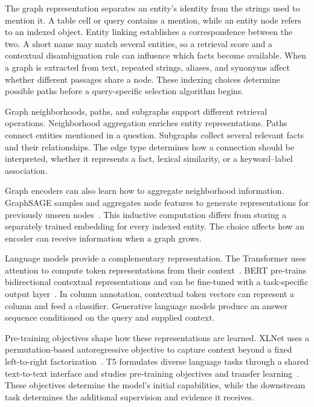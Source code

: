 The graph representation separates an entity's identity from the strings used to mention it. A table cell or query contains a mention, while an entity node refers to an indexed object. Entity linking establishes a correspondence between the two. A short name may match several entities, so a retrieval score and a contextual disambiguation rule can influence which facts become available. When a graph is extracted from text, repeated strings, aliases, and synonyms affect whether different passages share a node. These indexing choices determine possible paths before a query-specific selection algorithm begins.

Graph neighborhoods, paths, and subgraphs support different retrieval operations. Neighborhood aggregation enriches entity representations. Paths connect entities mentioned in a question. Subgraphs collect several relevant facts and their relationships. The edge type determines how a connection should be interpreted, whether it represents a fact, lexical similarity, or a keyword--label association.

Graph encoders can also learn how to aggregate neighborhood information. GraphSAGE samples and aggregates node features to generate representations for previously unseen nodes~\cite{lit-hamilton2017inductive}. This inductive computation differs from storing a separately trained embedding for every indexed entity. The choice affects how an encoder can receive information when a graph grows.

Language models provide a complementary representation. The Transformer uses attention to compute token representations from their context~\cite{bg-transformer}. BERT pre-trains bidirectional contextual representations and can be fine-tuned with a task-specific output layer~\cite{bg-bert}. In column annotation, contextual token vectors can represent a column and feed a classifier. Generative language models produce an answer sequence conditioned on the query and supplied context.

Pre-training objectives shape how these representations are learned. XLNet uses a permutation-based autoregressive objective to capture context beyond a fixed left-to-right factorization~\cite{lit-yang2019xlnet}. T5 formulates diverse language tasks through a shared text-to-text interface and studies pre-training objectives and transfer learning~\cite{lit-raffel2020exploring}. These objectives determine the model's initial capabilities, while the downstream task determines the additional supervision and evidence it receives.

